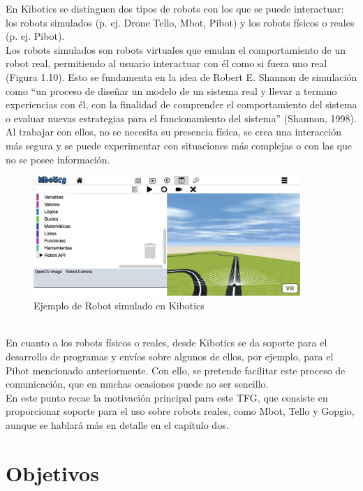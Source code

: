 \documentclass{report}
\begin{document}
En Kibotics se distinguen dos tipos de robots con los que se puede interactuar: los robots simulados (p. ej. Drone Tello, Mbot, Pibot) y los robots físicos o reales (p. ej. Pibot).
\\

Los robots simulados son robots virtuales que emulan el comportamiento de un robot real, permitiendo al usuario interactuar con él como si fuera uno real (Figura 1.10). Esto se fundamenta en la idea de Robert E. Shannon de simulación como “un proceso de diseñar un modelo de un sistema real y llevar a termino experiencias con él, con la finalidad de comprender el comportamiento del sistema o evaluar nuevas estrategias para el funcionamiento del sistema” (Shannon, 1998).  Al trabajar con ellos, no se necesita su presencia física, se crea una interacción más segura y se puede experimentar con situaciones más complejas o con las que no se posee información.
\\
\begin{figure}[h!]
  \centering
    \includegraphics[width=0.9\textwidth]{images/simulado.png}
  \caption{Ejemplo de Robot simulado en Kibotics}
  \label{Ejemplo de Robot simulado en Kibotics}
\end{figure}
\\

En cuanto a los robots físicos o reales, desde Kibotics se da soporte para el desarrollo de programas y envíos sobre algunos de ellos, por ejemplo, para el Pibot mencionado anteriormente. Con ello, se pretende facilitar este proceso de comunicación, que en muchas ocasiones puede no ser sencillo.
\\

En este punto recae la motivación principal para este TFG, que consiste en proporcionar soporte para el uso sobre robots reales, como Mbot, Tello y Gopgio, aunque se hablará más en detalle en el capítulo dos.

\chapter{Objetivos}
\end{document}
